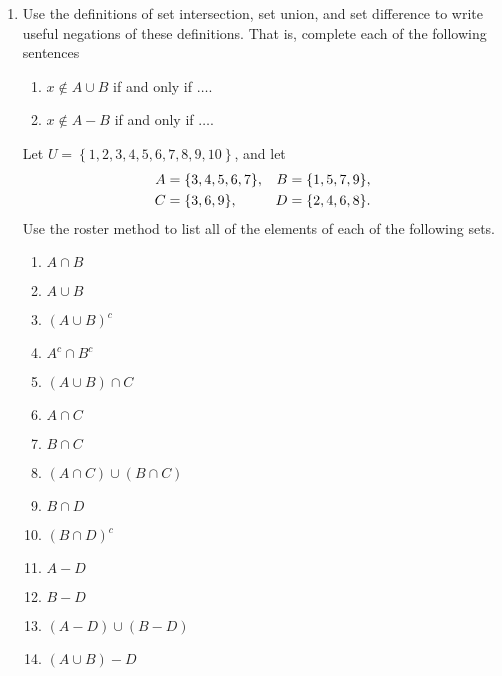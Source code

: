 \begin{enumerate}
\item Use the definitions of set intersection, set union, and set difference to write useful negations of these definitions.  That is, complete each of the following sentences
\label{exer:sec41-8}%
%
\begin{enumerate}
\yitem $x \notin A \cap B$  if and only if  $ \ldots .$
\item $x \notin A \cup B$  if and only if  $ \ldots .$
\item $x \notin A - B$  if and only if  $ \ldots .$
\end{enumerate}


\xitem Let  $U = \left\{ {1,2,3,4,5,6,7,8,9,10} \right\}$, and let \label{exer:sec41-6}
%
\begin{align} \notag
A &= \left\{ {3,4,5,6,7} \right\}\!,  &  B &= \left\{ {1,5,7,9} \right\}\!, \\ \notag
C &= \left\{ {3,6,9} \right\}\!,      &  D &= \left\{ {2,4,6,8} \right\}\!.  \notag
\notag
\end{align}
%
Use the roster method to list all of the elements of each of the following sets.
%
\begin{multicols}{2}
\begin{enumerate}
  \item $A \cap B$
  \item $A \cup B$
  \item $\left( {A \cup B} \right)^c $
  \item $A^c  \cap B^c $
  \item $\left( {A \cup B} \right) \cap C$
  \item $A \cap C$
  \item $B \cap C$
  \item $\left( {A \cap C} \right) \cup \left( {B \cap C} \right)$
  \item $B \cap D$
  \item $\left( {B \cap D} \right)^c $
  \item $A - D$
  \item $B - D$
  \item $\left( {A - D} \right) \cup \left( {B - D} \right)$
  \item $\left( {A \cup B} \right) - D$
\end{enumerate}
\end{multicols}



\end{enumerate}
